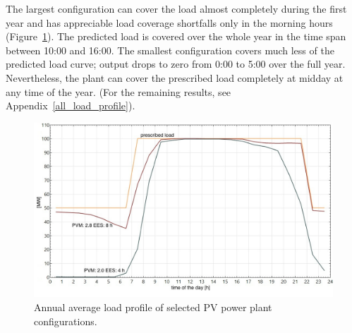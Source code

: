 
The largest configuration can cover the load almost completely during the first year and has appreciable load coverage shortfalls only in the morning hours (Figure~\ref{PV_annual_profil}). The predicted load is covered over the whole year in the time span between 10:00 and 16:00. The smallest configuration covers much less of the predicted load curve; output drops to zero from 0:00 to 5:00 over the full year. Nevertheless, the plant can cover the prescribed load completely at midday at any time of the year. (For the remaining results, see Appendix~\ref{all_load_profile}).


\begin{figure}[htbp]  
\centering
\includegraphics[width=0.8\linewidth]{FIG/PV_annual_profil}
\caption[Annual average load profile of selected PV power plant configurations.]{Annual average load profile of selected PV power plant configurations.}\label{PV_annual_profil}
\end{figure}

